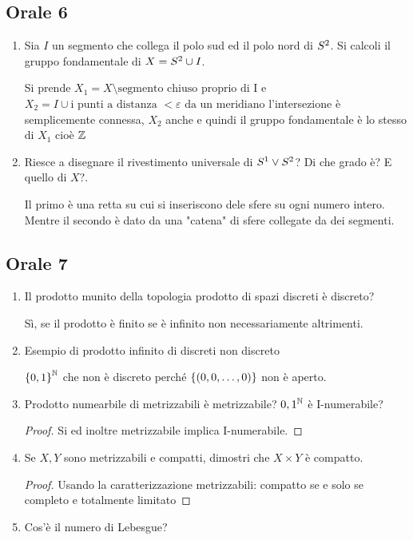 \documentclass[]{article}
\begin{document}
\subsection{Orale 6}
\begin{enumerate}
    \item Sia $I$ un segmento che collega il polo sud ed il polo nord di $S^{2}$. \nl
    Si calcoli il gruppo fondamentale di $X = S^{2} \cup I$.
    \begin{answer}
        Si prende $X_1 = X \setminus \text{segmento chiuso proprio di I}$ e $X_2 = I \cup \text{i punti a distanza } < \varepsilon \text{ da un meridiano}$
        l'intersezione \`e semplicemente connessa, $X_2$ anche e quindi il gruppo fondamentale \`e lo stesso di $X_1$ cio\`e $\mathbb{Z}$
    \end{answer}
    \item Riesce a disegnare il rivestimento universale di $S^{1} \vee S^{2}$? Di che grado \`e? E quello di $X$?.
    \begin{answer}
        Il primo \`e una retta su cui si inseriscono dele sfere su ogni numero intero. \nl
        Mentre il secondo \`e dato da una "catena" di sfere collegate da dei segmenti.
    \end{answer}
\end{enumerate}

\subsection{Orale 7}
\begin{enumerate}
    \item Il prodotto munito della topologia prodotto di spazi discreti \`e discreto?
    \begin{answer}
        S\`i, se il prodotto \`e finito se \`e infinito non necessariamente altrimenti.
    \end{answer}
    \item Esempio di prodotto infinito di discreti non discreto
    \begin{answer}
        $\left\{ 0,1 \right\}^{\mathbb{N}}$ che non \`e discreto perch\'e $\left\{ (0,0,\dots,0) \right\}$ non \`e aperto.
    \end{answer}
    \item Prodotto numearbile di metrizzabili \`e metrizzabile? ${0,1}^{\mathbb{N}}$ \`e I-numerabile?
    \begin{proof}
        Si ed inoltre metrizzabile implica I-numerabile.
    \end{proof}
    \item Se $X,Y$ sono metrizzabili e compatti, dimostri che $X \times Y$ \`e compatto.
    \begin{proof}
        Usando la caratterizzazione metrizzabili: compatto se e solo se completo e totalmente limitato
    \end{proof}
    \item Cos'\`e il numero di Lebesgue?
\end{enumerate}
\end{document}
